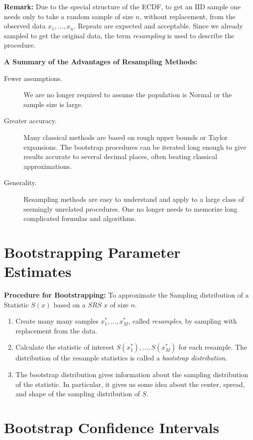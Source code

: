\documentclass[captions=tableheading]{scrbook}
\begin{document}
\textbf{Remark:} Due to the special structure of the ECDF, to get an IID sample one needs only to take a random sample of size $n$, without replacement, from the observed data $x_{1},\ldots,x_{n}$. Repeats are expected and acceptable. Since we already sampled to get the original data, the term \emph{resampling} is used to describe the procedure.

\textbf{A Summary of the Advantages of Resampling Methods:}


\begin{description}
\item[Fewer assumptions.] We are no longer required to assume the population is Normal or the sample size is large.
\item[Greater accuracy.] Many classical methods are based on rough upper bounds or Taylor expansions. The bootstrap procedures can be iterated long enough to give results accurate to several decimal places, often beating classical approximations.
\item[Generality.] Resampling methods are easy to understand and apply to a large class of seemingly unrelated procedures. One no longer needs to memorize long complicated formulas and algorithms.
\end{description}
\section{Bootstrapping Parameter Estimates}
\label{sec-5_3}


\textbf{Procedure for Bootstrapping:} To approximate the Sampling distribution of a Statistic $S(x)$ based on a $SRS$ $x$ of size $n$.


\begin{enumerate}
\item Create many many samples $x_{1}^{\ast},\ldots,x_{M}^{\ast}$, called \emph{resamples}, by sampling with replacement from the data.
\item Calculate the statistic of interest $S(x_{1}^{\ast}),\ldots,S(x_{M}^{\ast})$ for each resample. The distribution of the resample statistics is called a \emph{bootstrap distribution}.
\item The bootstrap distribution gives information about the sampling distribution of the statistic. In particular, it gives us some idea about the center, spread, and shape of the sampling distribution of $S$.
\end{enumerate}
\section{Bootstrap Confidence Intervals}
\label{sec-5_4}
\end{document}
